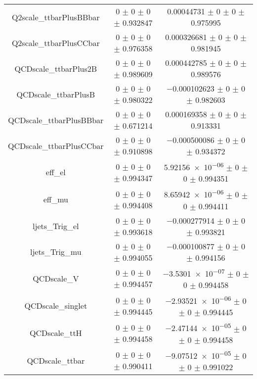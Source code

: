 \begin{table}
\begin{tabular}{ccc}
Q2scale\_ttbarPlusBBbar & \num{0} $\pm$ \num{0} $\pm$ \num{0} $\pm$ \num{0.932847} & \num{0.00044731} $\pm$ \num{0} $\pm$ \num{0} $\pm$ \num{0.975995}\\
Q2scale\_ttbarPlusCCbar & \num{0} $\pm$ \num{0} $\pm$ \num{0} $\pm$ \num{0.976358} & \num{0.000326681} $\pm$ \num{0} $\pm$ \num{0} $\pm$ \num{0.981945}\\
QCDscale\_ttbarPlus2B & \num{0} $\pm$ \num{0} $\pm$ \num{0} $\pm$ \num{0.989609} & \num{0.000442785} $\pm$ \num{0} $\pm$ \num{0} $\pm$ \num{0.989576}\\
QCDscale\_ttbarPlusB & \num{0} $\pm$ \num{0} $\pm$ \num{0} $\pm$ \num{0.980322} & \num{-0.000102623} $\pm$ \num{0} $\pm$ \num{0} $\pm$ \num{0.982603}\\
QCDscale\_ttbarPlusBBbar & \num{0} $\pm$ \num{0} $\pm$ \num{0} $\pm$ \num{0.671214} & \num{0.000169358} $\pm$ \num{0} $\pm$ \num{0} $\pm$ \num{0.913331}\\
QCDscale\_ttbarPlusCCbar & \num{0} $\pm$ \num{0} $\pm$ \num{0} $\pm$ \num{0.910898} & \num{-0.000500086} $\pm$ \num{0} $\pm$ \num{0} $\pm$ \num{0.934372}\\
eff\_el & \num{0} $\pm$ \num{0} $\pm$ \num{0} $\pm$ \num{0.994347} & \num{5.92156e-06} $\pm$ \num{0} $\pm$ \num{0} $\pm$ \num{0.994351}\\
eff\_mu & \num{0} $\pm$ \num{0} $\pm$ \num{0} $\pm$ \num{0.994408} & \num{8.65942e-06} $\pm$ \num{0} $\pm$ \num{0} $\pm$ \num{0.994411}\\
ljets\_Trig\_el & \num{0} $\pm$ \num{0} $\pm$ \num{0} $\pm$ \num{0.993618} & \num{-0.000277914} $\pm$ \num{0} $\pm$ \num{0} $\pm$ \num{0.993821}\\
ljets\_Trig\_mu & \num{0} $\pm$ \num{0} $\pm$ \num{0} $\pm$ \num{0.994055} & \num{-0.000100877} $\pm$ \num{0} $\pm$ \num{0} $\pm$ \num{0.994156}\\
QCDscale\_V & \num{0} $\pm$ \num{0} $\pm$ \num{0} $\pm$ \num{0.994457} & \num{-3.5301e-07} $\pm$ \num{0} $\pm$ \num{0} $\pm$ \num{0.994458}\\
QCDscale\_singlet & \num{0} $\pm$ \num{0} $\pm$ \num{0} $\pm$ \num{0.994445} & \num{-2.93521e-06} $\pm$ \num{0} $\pm$ \num{0} $\pm$ \num{0.994445}\\
QCDscale\_ttH & \num{0} $\pm$ \num{0} $\pm$ \num{0} $\pm$ \num{0.994458} & \num{-2.47144e-05} $\pm$ \num{0} $\pm$ \num{0} $\pm$ \num{0.994458}\\
QCDscale\_ttbar & \num{0} $\pm$ \num{0} $\pm$ \num{0} $\pm$ \num{0.990411} & \num{-9.07512e-05} $\pm$ \num{0} $\pm$ \num{0} $\pm$ \num{0.991022}\\

\end{tabular}
\end{table}
